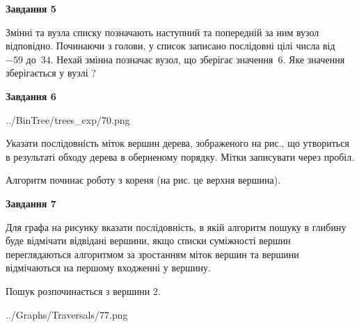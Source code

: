 \documentclass[12pt, ukrainian]{article}
\begin{document}
{\begin {large}
{\begin {center}\textbf{Завдання 5}\end {center}}\par
Змінні  та  вузла списку позначають наступний та попередній за ним вузол відповідно. Починаючи з голови, у список записано послідовні цілі числа від~$-59$ до~$34$. Нехай змінна  позначає вузол, що зберігає значення~$6$.
Яке значення зберігається у вузлі  ?\par
\newpage

{\begin {center}\textbf{Завдання 6}\end {center}}\par

\begin{center}
	{../BinTree/trees_exp/70.png}
\end{center}
Указати послідовність міток вершин дерева, зображеного на рис., що утвориться в результаті обходу дерева в оберненому порядку. Мітки записувати через пробіл.\par Алгоритм починає роботу з кореня (на рис. це верхня вершина).\par
\newpage

{\begin {center}\textbf{Завдання 7}\end {center}}\par
Для графа на рисунку вказати послідовність, в якій алгоритм пошуку в глибину буде відмічати відвідані вершини, якщо списки суміжності вершин переглядаються алгоритмом за зростанням міток вершин та вершини відмічаються на першому вход\-женні у вершину.\par
Пошук розпочинається з вершини 2.\par

\begin{center}
	{../Graphs/Traversals/77.png}
\end{center}\par
\newpage


\end{large}}
\end{document}
